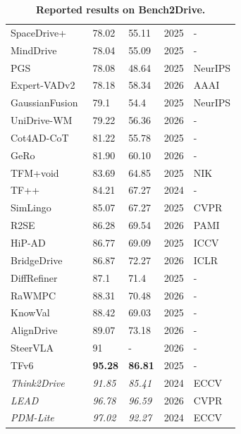 \documentclass[10pt,twocolumn,letterpaper]{article}
\begin{document}
\begin{table}[t]
\begin{tabular}{l|ll|ll}
SpaceDrive+~\cite{Li2025ARXIVc} & 78.02 & 55.11 & 2025 & - \\
MindDrive~\cite{Fu2025ARXIV} & 78.04 & 55.09 & 2025 & - \\
PGS~\cite{Huang2025NEURIPS} & 78.08 & 48.64 & 2025 & NeurIPS \\
Expert-VADv2~\cite{Jiang2026AAAI} & 78.18 & 58.34 & 2026 & AAAI \\
GaussianFusion~\cite{Liu2025NEURIPS} & 79.1 & 54.4 & 2025 & NeurIPS \\
UniDrive-WM \cite{Xiong2026ARXIV} & 79.22 & 56.36 & 2026 & - \\
Cot4AD-CoT\cite{Wang2025ARXIVc} & 81.22 & 55.78 & 2025 & - \\
GeRo\cite{Yasarla2026ARXIV} & 81.90 & 60.10 & 2026 & - \\
TFM+void~\cite{Winje2025NIK} & 83.69 & 64.85 & 2025 & NIK \\
TF++~\cite{Zimmerlin2024ArXiv} & 84.21 & 67.27 & 2024 & - \\
SimLingo~\cite{Renz2025CVPR} & 85.07 & 67.27 & 2025 & CVPR \\
R2SE~\cite{Liu2026PAMI} & 86.28 & 69.54 & 2026 & PAMI \\
HiP-AD~\cite{Tang2025ICCV} & 86.77 & 69.09 & 2025 & ICCV \\
BridgeDrive~\cite{Liu2026ICLR} & 86.87 & 72.27 & 2026 & ICLR \\
DiffRefiner~\cite{Yin2025ARXIV} & 87.1 & 71.4 & 2025 & - \\
RaWMPC~\cite{Sun2026ARXIV} & 88.31 & 70.48 & 2026 & - \\
KnowVal~\cite{Xia2025ARXIV} & 88.42 & 69.03 & 2025 & - \\
AlignDrive~\cite{Wu2026ARXIV} & 89.07 & 73.18 & 2026 & - \\
SteerVLA~\cite{Gao2026ARXIV} & 91 & - & 2026 & - \\
TFv6~\cite{Nguyen2026CVPR} & \textbf{95.28} & \textbf{86.81} & 2025 & - \\
\midrule
\textit{Think2Drive}~\cite{Li2024ECCV} & \textit{91.85} & \textit{85.41} & 2024 & ECCV \\
\textit{LEAD}~\cite{Nguyen2026CVPR} & \textit{96.78} & \textit{96.59} & 2026 & CVPR \\
\textit{PDM-Lite}~\cite{Sima2024ECCV} & \textit{97.02} & \textit{92.27} & 2024 & ECCV \\
\bottomrule
\end{tabular}
\caption{\textbf{Reported results on Bench2Drive.}}
\label{tab:b2d}
\end{table}


\clearpage


{
    \small
    
    
}
\end{document}
